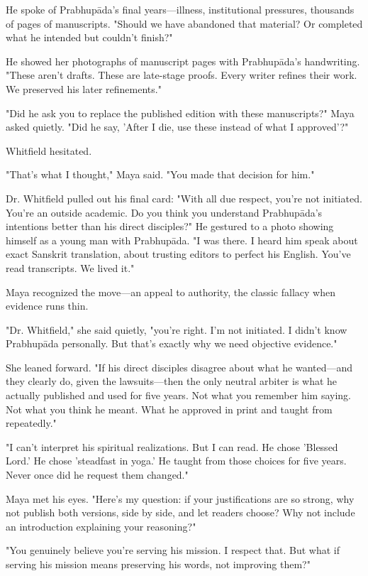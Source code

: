 \documentclass[12pt,twoside]{book}
\begin{document}
He spoke of Prabhupāda's final years—illness, institutional pressures, thousands of pages of manuscripts. "Should we have abandoned that material? Or completed what he intended but couldn't finish?"

He showed her photographs of manuscript pages with Prabhupāda's handwriting. "These aren't drafts. These are late-stage proofs. Every writer refines their work. We preserved his later refinements."

"Did he ask you to replace the published edition with these manuscripts?" Maya asked quietly. "Did he say, 'After I die, use these instead of what I approved'?"

Whitfield hesitated.

"That's what I thought," Maya said. "You made that decision for him."

Dr. Whitfield pulled out his final card: "With all due respect, you're not initiated. You're an outside academic. Do you think you understand Prabhupāda's intentions better than his direct disciples?" He gestured to a photo showing himself as a young man with Prabhupāda. "I was there. I heard him speak about exact Sanskrit translation, about trusting editors to perfect his English. You've read transcripts. We lived it."

Maya recognized the move—an appeal to authority, the classic fallacy when evidence runs thin.

"Dr. Whitfield," she said quietly, "you're right. I'm not initiated. I didn't know Prabhupāda personally. But that's exactly why we need objective evidence."

She leaned forward. "If his direct disciples disagree about what he wanted—and they clearly do, given the lawsuits—then the only neutral arbiter is what he actually published and used for five years. Not what you remember him saying. Not what you think he meant. What he approved in print and taught from repeatedly."

"I can't interpret his spiritual realizations. But I can read. He chose 'Blessed Lord.' He chose 'steadfast in yoga.' He taught from those choices for five years. Never once did he request them changed."

Maya met his eyes. "Here's my question: if your justifications are so strong, why not publish both versions, side by side, and let readers choose? Why not include an introduction explaining your reasoning?"

"You genuinely believe you're serving his mission. I respect that. But what if serving his mission means preserving his words, not improving them?"
\end{document}
